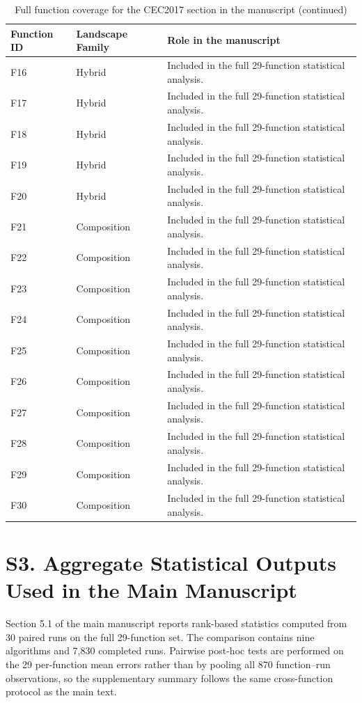 \documentclass[11pt]{article}
\begin{document}
\begin{table}[htbp]
\centering
\caption{Full function coverage for the CEC2017 section in the manuscript (continued)}
\begin{tabular}{>{\RaggedRight\arraybackslash}p{} >{\RaggedRight\arraybackslash}p{} >{\RaggedRight\arraybackslash}p{}}
\toprule
\textbf{Function ID} & \textbf{Landscape Family} & \textbf{Role in the manuscript} \\
\midrule
F16 & Hybrid & Included in the full 29-function statistical analysis. \\
F17 & Hybrid & Included in the full 29-function statistical analysis. \\
F18 & Hybrid & Included in the full 29-function statistical analysis. \\
F19 & Hybrid & Included in the full 29-function statistical analysis. \\
F20 & Hybrid & Included in the full 29-function statistical analysis. \\
F21 & Composition & Included in the full 29-function statistical analysis. \\
F22 & Composition & Included in the full 29-function statistical analysis. \\
F23 & Composition & Included in the full 29-function statistical analysis. \\
F24 & Composition & Included in the full 29-function statistical analysis. \\
F25 & Composition & Included in the full 29-function statistical analysis. \\
F26 & Composition & Included in the full 29-function statistical analysis. \\
F27 & Composition & Included in the full 29-function statistical analysis. \\
F28 & Composition & Included in the full 29-function statistical analysis. \\
F29 & Composition & Included in the full 29-function statistical analysis. \\
F30 & Composition & Included in the full 29-function statistical analysis. \\
\bottomrule
\end{tabular}
\end{table}

\section*{S3. Aggregate Statistical Outputs Used in the Main Manuscript}
Section 5.1 of the main manuscript reports rank-based statistics computed from 30 paired runs on the full 29-function set. The comparison contains nine algorithms and 7,830 completed runs. Pairwise post-hoc tests are performed on the 29 per-function mean errors rather than by pooling all 870 function--run observations, so the supplementary summary follows the same cross-function protocol as the main text.
\end{document}
